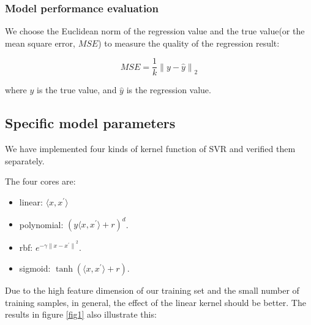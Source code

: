 \documentclass{mcmthesis}
\begin{document}
\subsubsection{Model performance evaluation}


We choose the Euclidean norm of the regression value and the true value(or the mean square error, $MSE$) to measure the quality of the regression result:

\begin{equation}
MSE = \frac{1}{k}{\|y-\hat{y}\|}_2
\end{equation}

where $y$ is the true value, and $\hat{y}$ is the regression value.

\subsection{Specific model parameters}

We have implemented four kinds of kernel function\cite{SVRs} of SVR and verified them separately. 

The four cores are:

\begin{itemize}
	\item linear: $\langle x,x^\prime \rangle$
	\item polynomial: ${(y\langle x,x^\prime \rangle + r)}^d$.
	\item rbf: $e^{-\gamma{\|x-x^\prime\|}^2}$.
	\item sigmoid: $\tanh(\langle x,x^\prime \rangle + r)$.
\end{itemize}

Due to the high feature dimension of our training set and the small number of training samples, in general, the effect of the linear kernel should be better. The results in figure \ref{fig1} also illustrate this:
\end{document}
